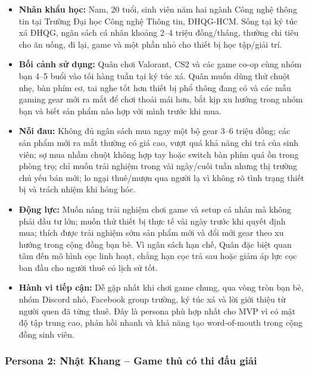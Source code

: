\begin{itemize}
    \item \textbf{Nhân khẩu học:} Nam, 20 tuổi, sinh viên năm hai ngành Công nghệ thông tin tại Trường Đại học Công nghệ Thông tin, ĐHQG-HCM. Sống tại ký túc xá ĐHQG, ngân sách cá nhân khoảng 2--4 triệu đồng/tháng, thường chi tiêu cho ăn uống, đi lại, game và một phần nhỏ cho thiết bị học tập/giải trí.
    \item \textbf{Bối cảnh sử dụng:} Quân chơi Valorant, CS2 và các game co-op cùng nhóm bạn 4--5 buổi vào tối hàng tuần tại ký túc xá. Quân muốn dùng thử chuột nhẹ, bàn phím cơ, tai nghe tốt hơn thiết bị phổ thông đang có và các mẫu gaming gear mới ra mắt để chơi thoải mái hơn, bắt kịp xu hướng trong nhóm bạn và biết sản phẩm nào hợp với mình trước khi mua.
    \item \textbf{Nỗi đau:} Không đủ ngân sách mua ngay một bộ gear 3--6 triệu đồng; các sản phẩm mới ra mắt thường có giá cao, vượt quá khả năng chi trả của sinh viên; sợ mua nhầm chuột không hợp tay hoặc switch bàn phím quá ồn trong phòng trọ; chỉ muốn trải nghiệm trong vài ngày/cuối tuần nhưng thị trường chủ yếu bán mới; lo ngại thuê/mượn qua người lạ vì không rõ tình trạng thiết bị và trách nhiệm khi hỏng hóc.
    \item \textbf{Động lực:} Muốn nâng trải nghiệm chơi game và setup cá nhân mà không phải đầu tư lớn; muốn thử thiết bị thực tế vài ngày trước khi quyết định mua; thích được trải nghiệm sớm sản phẩm mới và đổi mới gear theo xu hướng trong cộng đồng bạn bè. Vì ngân sách hạn chế, Quân đặc biệt quan tâm đến mô hình cọc linh hoạt, chẳng hạn cọc trả sau hoặc giảm áp lực cọc ban đầu cho người thuê có lịch sử tốt.
    \item \textbf{Hành vi tiếp cận:} Dễ gặp nhất khi chơi game chung, qua vòng tròn bạn bè, nhóm Discord nhỏ, Facebook group trường, ký túc xá và lời giới thiệu từ người quen đã từng thuê. Đây là persona phù hợp nhất cho MVP vì có mật độ tập trung cao, phản hồi nhanh và khả năng tạo word-of-mouth trong cộng đồng sinh viên.
\end{itemize}

\subsubsection{Persona 2: Nhật Khang -- Game thủ có thi đấu giải}

